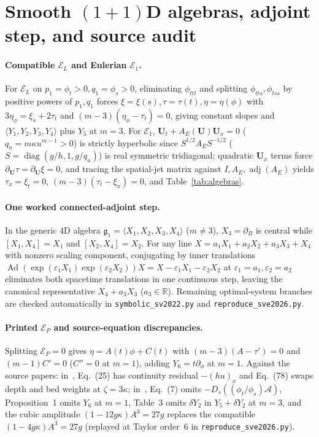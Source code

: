 \documentclass[12pt,a4paper,oneside]{report}
\numberwithin{equation}{chapter}
\theoremstyle{definition}
\theoremstyle{remark}\newtheorem{remark}[theorem]{Remark}
\DeclareRobustCommand{\code}[1]{\nolinkurl{#1}}
\begin{document}
\section{Smooth \texorpdfstring{$(1+1)$D}{(1+1)D} algebras, adjoint step, and source audit}\label{app:classproof}\label{app:audit}

\paragraph{Compatible $\mathcal E_L$ and Eulerian $\mathcal E_1$.}
For $\mathcal E_L$ on $p_1=\phi_t>0,q_1=\phi_s>0$, eliminating $\phi_{ttt}$ and splitting $\phi_{tts},\phi_{tss}$ by positive powers of $p_1,q_1$ forces $\xi=\xi(s),\tau=\tau(t),\eta=\eta(\phi)$ with $3\eta_\phi=\xi_s+2\tau_t$ and $(m-3)(\eta_\phi-\tau_t)=0$, giving constant slopes and $\langle Y_1,Y_2,Y_3,Y_4\rangle$ plus $Y_5$ at $m=3$. For $\mathcal E_1$, $\mathbf U_t+A_E(\mathbf U)\mathbf U_x=0$ ($q_u=m\kappa u^{m-1}>0$) is strictly hyperbolic since $S^{1/2}A_ES^{-1/2}$ ($S=\operatorname{diag}(g/h,1,g/q_u)$) is real symmetric tridiagonal; quadratic $\mathbf U_x$ terms force $\partial_{\mathbf U}\tau=\partial_{\mathbf U}\xi=0$, and tracing the spatial-jet matrix against $I,A_E,\operatorname{adj}(A_E)$ yields $\tau_x=\xi_t=0$, $(m-3)(\tau_t-\xi_x)=0$, and Table~\ref{tab:algebras}.

\paragraph{One worked connected-adjoint step.}
In the generic 4D algebra $\mathfrak g_1=\langle X_1,X_2,X_3,X_4\rangle$ ($m\ne3$), $X_3=\partial_B$ is central while $[X_1,X_4]=X_1$ and $[X_2,X_4]=X_2$. For any line $X=a_1X_1+a_2X_2+a_3X_3+X_4$ with nonzero scaling component, conjugating by inner translations $\operatorname{Ad}(\exp(\varepsilon_1X_1)\exp(\varepsilon_2X_2))X=X-\varepsilon_1X_1-\varepsilon_2X_2$ at $\varepsilon_1=a_1,\varepsilon_2=a_2$ eliminates both spacetime translations in one continuous step, leaving the canonical representative $X_4+a_3X_3$ ($a_3\in\mathbb R$). Remaining optimal-system branches are checked automatically in \code{symbolic_sv2022.py} and \code{reproduce_sve2026.py}.

\paragraph{Printed $\mathcal E_P$ and source-equation discrepancies.}
Splitting $\mathcal E_P=0$ gives $\eta=A(t)\phi+C(t)$ with $(m-3)(A-\tau')=0$ and $(m-1)C'=0$ ($C''=0$ at $m=1$), adding $Y_6=t\partial_\phi$ at $m=1$. Against the source papers: in~\cite{sve2022}, Eq.~(25) has continuity residual $-(hu)_x$ and Eq.~(78) swaps depth and bed weights at $\zeta=3\kappa$; in~\cite{sve2026}, Eq.~(7) omits $-D_s((\phi_t/\phi_s)\mathcal A)$, Proposition~1 omits $Y_6$ at $m=1$, Table~3 omits $\delta Y_2$ in $Y_5+\delta Y_2$ at $m=3$, and the cubic amplitude $(1-12g\kappa)A^3=27g$ replaces the compatible $(1-4g\kappa)A^3=27g$ (replayed at Taylor order~$6$ in \code{reproduce_sve2026.py}).
\end{document}
